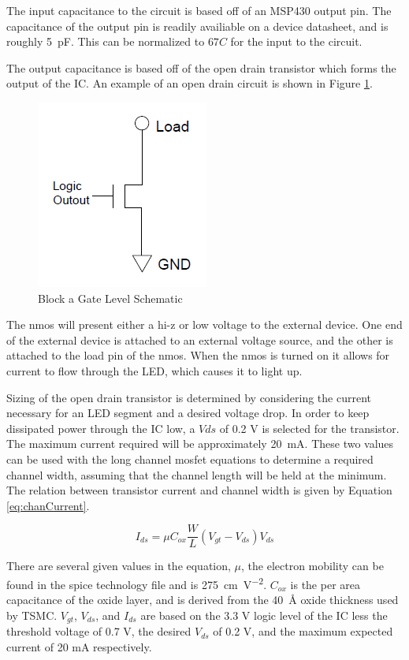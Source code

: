 \documentclass[12pt]{article}
\begin{document}
The input capacitance to the circuit is based off of an MSP430 output pin.
The capacitance of the output pin is readily availiable on a device datasheet, and is roughly \SI{5}{\pico\farad}.
This can be normalized to \(67C\) for the input to the circuit.

The output capacitance is based off of the open drain transistor which forms the output of the IC.
An example of an open drain circuit is shown in Figure \ref{fig:openCollector}.

\begin{figure}[H]
	\centering	
	\includegraphics[width=0.25\linewidth, keepaspectratio]{openCollector.png}
	\caption{Block a Gate Level Schematic}
	\label{fig:openCollector}
\end{figure}

The nmos will present either a hi-z or low voltage to the external device.
One end of the external device is attached to an external voltage source, and the other is attached to the load pin of the nmos.
When the nmos is turned on it allows for current to flow through the LED, which causes it to light up. 

Sizing of the open drain transistor is determined by considering the current necessary for an LED segment and a desired voltage drop.
In order to keep dissipated power through the IC low, a \(Vds\) of 0.2 V is selected for the transistor.
The maximum current required will be approximately \SI{20}{\milli\ampere}.
These two values can be used with the long channel mosfet equations to determine a required channel width, assuming that the channel length will be held at the minimum.
The relation between transistor current and channel width is given by Equation \eqref{eq:chanCurrent}.

\begin{equation}
\label{eq:chanCurrent}
 I_{ds} = \mu C_{ox} \frac{W}{L} (V_{gt} - V_{ds}) V_{ds}
\end{equation}

There are several given values in the equation, \(\mu\), the electron mobility can be found in the spice technology file and is \SI{275}{\centi\meter\per\volt\squared}.
\(C_{ox}\) is the per area capacitance of the oxide layer, and is derived from the \SI{40}{\angstrom} oxide thickness used by TSMC.
\(V_{gt}\), \(V_{ds}\), and \(I_{ds}\) are based on the 3.3 V logic level of the IC less the threshold voltage of 0.7 V, the desired \(V_{ds}\) of 0.2 V, and the maximum expected current of 20 mA respectively.
\end{document}
